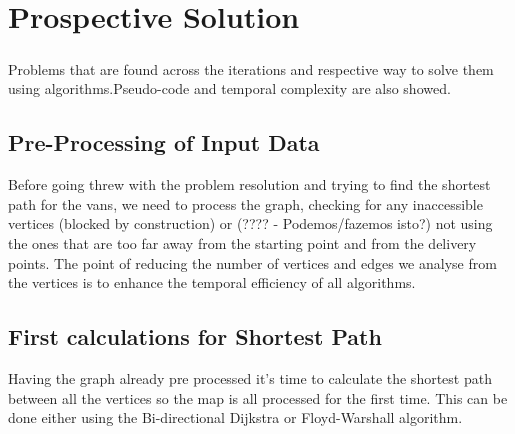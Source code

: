 \chapter{Prospective Solution}

\paragraph {} Problems that are found across the iterations and respective way to solve them using algorithms.Pseudo-code and temporal complexity are also showed.

\section{Pre-Processing of Input Data}
Before going threw with the problem resolution and trying to find the shortest path for the vans, we need to process the graph, checking for any inaccessible vertices (blocked by construction) or (???? - Podemos/fazemos isto?) not using the ones that are too far away from the starting point and from the delivery points. The point of reducing the number of vertices and edges we analyse from the vertices is to enhance the temporal efficiency of all algorithms.

\section{First calculations for Shortest Path}
Having the graph already pre processed it's time to calculate the shortest path between all the vertices so the map is all processed for the first time. This can be done either using the Bi-directional Dijkstra or Floyd-Warshall algorithm. 